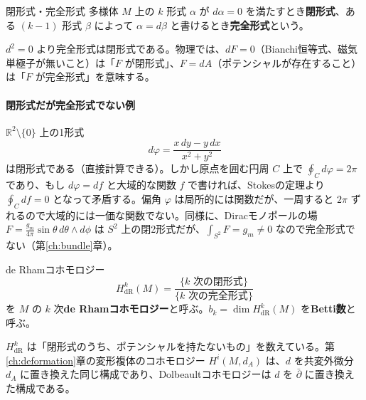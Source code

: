 \documentclass[uplatex, dvipdfmx, book]{jsbook}
\begin{document}
\begin{mydef}{閉形式・完全形式}{}
多様体 $M$ 上の $k$ 形式 $\alpha$ が $d\alpha = 0$ を満たすとき\textbf{閉形式}、ある $(k-1)$ 形式 $\beta$ によって $\alpha = d\beta$ と書けるとき\textbf{完全形式}という。
\end{mydef}
$d^2 = 0$ より完全形式は閉形式である。物理では、$dF = 0$（Bianchi恒等式、磁気単極子が無いこと）は「$F$ が閉形式」、$F = dA$（ポテンシャルが存在すること）は「$F$ が完全形式」を意味する。

\paragraph{閉形式だが完全形式でない例}
$\mathbb{R}^2 \setminus \{0\}$ 上の1形式
\begin{equation}
    d\varphi = \frac{x\,dy - y\,dx}{x^2 + y^2}
\end{equation}
は閉形式である（直接計算できる）。しかし原点を囲む円周 $C$ 上で $\oint_C d\varphi = 2\pi$ であり、もし $d\varphi = df$ と大域的な関数 $f$ で書ければ、Stokesの定理より $\oint_C df = 0$ となって矛盾する。偏角 $\varphi$ は局所的には関数だが、一周すると $2\pi$ ずれるので大域的には一価な関数でない。同様に、Diracモノポールの場 $F = \frac{g_m}{4\pi}\sin\theta\,d\theta \wedge d\phi$ は $S^2$ 上の閉2形式だが、$\int_{S^2} F = g_m \neq 0$ なので完全形式でない（第\ref{ch:bundle}章）。

\begin{mydef}{de Rhamコホモロジー}{}
\begin{equation*}
    H^k_{\mathrm{dR}}(M) = \frac{\{ k \text{ 次の閉形式} \}}{\{ k \text{ 次の完全形式} \}}
\end{equation*}
を $M$ の $k$ 次\textbf{de Rhamコホモロジー}と呼ぶ。$b_k = \dim H^k_{\mathrm{dR}}(M)$ を\textbf{Betti数}と呼ぶ。
\end{mydef}

$H^k_{\mathrm{dR}}$ は「閉形式のうち、ポテンシャルを持たないもの」を数えている。第\ref{ch:deformation}章の変形複体のコホモロジー $H^i(M, d_A)$ は、$d$ を共変外微分 $d_A$ に置き換えた同じ構成であり、Dolbeaultコホモロジーは $d$ を $\bar\partial$ に置き換えた構成である。
\end{document}
